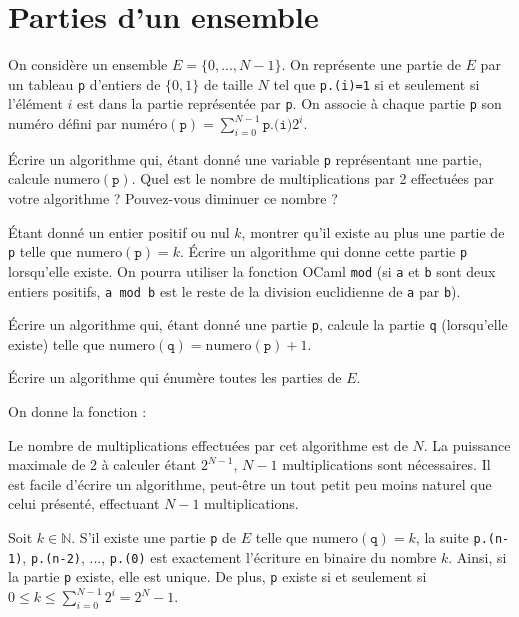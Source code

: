 \renewcommand{\SourceFile}{7-arithmetique-et-calculs-numeriques/src/7-1.ml}

\section{Parties d'un ensemble}

On considère un ensemble $E=\{0,...,N-1\}$. On représente une partie de $E$ par un tableau \texttt{p} d'entiers de $\{0,1\}$ de taille $N$ tel que \texttt{p.(i)=1} si et seulement si l'élément $i$ est dans la partie représentée par \texttt{p}. On associe à chaque partie \texttt{p} son numéro défini par $\textrm{numéro}(\texttt{p})=\sum_{i=0}^{N-1}\texttt{p.(i)}2^i$.

\Q
Écrire un algorithme qui, étant donné une variable \texttt{p} représentant une partie, calcule $\textrm{numero}(\texttt{p})$. Quel est le nombre de multiplications par 2 effectuées par votre algorithme ? Pouvez-vous diminuer ce nombre ?

\Q
Étant donné un entier positif ou nul $k$, montrer qu'il existe au plus une partie de \texttt{p} telle que $\textrm{numero}(\texttt{p})=k$. Écrire un algorithme qui donne cette partie \texttt{p} lorsqu'elle existe. On pourra utiliser la fonction OCaml \texttt{mod} (si \texttt{a} et \texttt{b} sont deux entiers positifs, \texttt{a mod b} est le reste de la division euclidienne de \texttt{a} par \texttt{b}).

\Q
Écrire un algorithme qui, étant donné une partie \texttt{p}, calcule la partie \texttt{q} (lorsqu'elle existe) telle que $\textrm{numero}(\texttt{q})=\textrm{numero}(\texttt{p})+1$.

\Q
Écrire un algorithme qui énumère toutes les parties de $E$.

\Corrige

\Q
On donne la fonction :



Le nombre de multiplications effectuées par cet algorithme est de $N$. La puissance maximale de 2 à calculer étant $2^{N-1}$, $N-1$ multiplications sont nécessaires. Il est facile d'écrire un algorithme, peut-être un tout petit peu moins naturel que celui présenté, effectuant $N-1$ multiplications.

\Q
Soit $k \in \mathbb{N}$. S'il existe une partie \texttt{p} de $E$ telle que $\textrm{numero}(\texttt{q})=k$, la suite \texttt{p.(n-1)}, \texttt{p.(n-2)}, ..., \texttt{p.(0)} est exactement l'écriture en binaire du nombre $k$. Ainsi, si la partie \texttt{p} existe, elle est unique. De plus, \texttt{p} existe si et seulement si $0 \leq k \leq \sum_{i=0}^{N-1}2^i=2^{N}-1$.
\medskip

